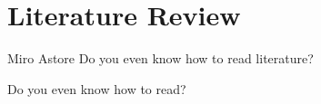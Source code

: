 \chapter{Literature Review}

\label{chap:lit_review}

\begin{chapquote} {Miro Astore}
	Do you even know how to read literature?
\end{chapquote}

Do you even know how to read?
